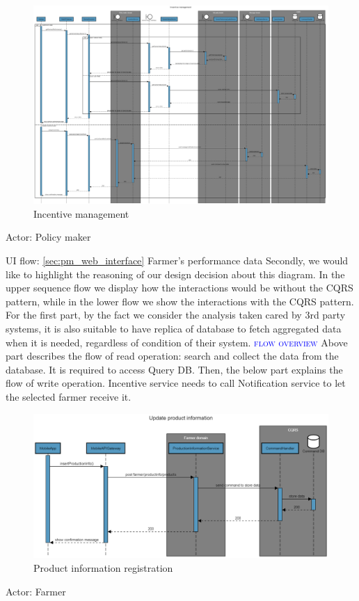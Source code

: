 \newpage
\begin{figure}[H]
	\centering
    \includegraphics[width=\textwidth]{Images/sequence-diagram/incentive-management.png}
	\caption{\label{fig:se_incentive}Incentive management}
\end{figure}
Actor: Policy maker

UI flow: {\ref{sec:pm_web_interface} Farmer's performance data}
\newline
\newline
Secondly, we would like to highlight the reasoning of our design decision about this diagram. In the upper sequence flow we display how the interactions would be without the CQRS pattern, while in the lower flow we show the interactions with the CQRS pattern.
For the first part, by the fact we consider the analysis taken cared by 3rd party systems, it is also suitable to have replica of database to fetch aggregated data when it is needed, regardless of condition of their system.
\newline
\newline
\textsc{\textcolor{blue}{flow overview}}
\newline
Above part describes the flow of read operation: search and collect the data from the database. It is required to access Query DB.
Then, the below part explains the flow of write operation.
Incentive service needs to call Notification service to let the selected farmer receive it.

\newpage
\begin{figure}[H]
	\centering
    \includegraphics[width=\textwidth]{Images/sequence-diagram/product-info.png}
	\caption{\label{fig:se_product}Product information registration}
\end{figure}
Actor: Farmer

